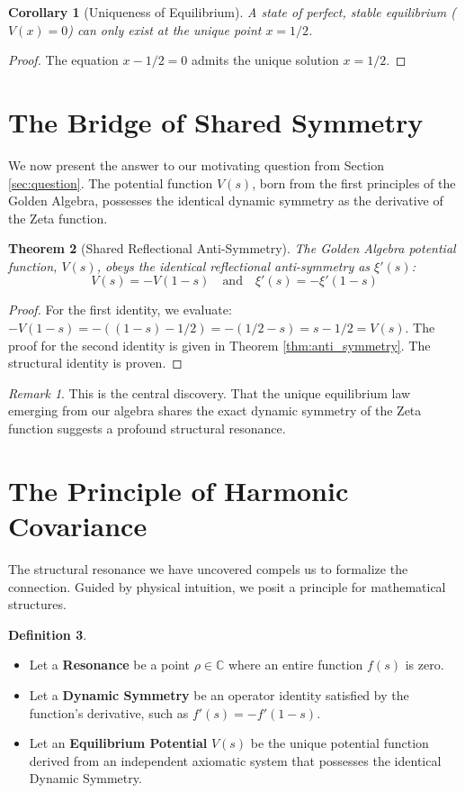 \documentclass{article}
\theoremstyle{plain}
\newtheorem{theorem}{Theorem}[section]
\newtheorem{corollary}[theorem]{Corollary}
\theoremstyle{definition}
\newtheorem{definition}[theorem]{Definition}
\theoremstyle{remark}
\newtheorem*{remark}{Remark}
\begin{document}
\begin{corollary}[Uniqueness of Equilibrium]
A state of perfect, stable equilibrium ($V(x)=0$) can only exist at the unique point $x=1/2$.
\end{corollary}
\begin{proof}
The equation $x - 1/2 = 0$ admits the unique solution $x=1/2$.
\end{proof}

\section{The Bridge of Shared Symmetry}
\label{sec:bridge}
We now present the answer to our motivating question from Section \ref{sec:question}. The potential function $V(s)$, born from the first principles of the Golden Algebra, possesses the identical dynamic symmetry as the derivative of the Zeta function.

\begin{theorem}[Shared Reflectional Anti-Symmetry]
The Golden Algebra potential function, $V(s)$, obeys the identical reflectional anti-symmetry as $\xi'(s)$:
$$ V(s) = -V(1-s) \quad \text{and} \quad \xi'(s) = -\xi'(1-s) $$
\end{theorem}
\begin{proof}
For the first identity, we evaluate: $-V(1-s) = -((1-s) - 1/2) = -(1/2 - s) = s - 1/2 = V(s)$. The proof for the second identity is given in Theorem \ref{thm:anti_symmetry}. The structural identity is proven.
\end{proof}

\begin{remark}
This is the central discovery. That the unique equilibrium law emerging from our algebra shares the exact dynamic symmetry of the Zeta function suggests a profound structural resonance.
\end{remark}

\section{The Principle of Harmonic Covariance}
\label{sec:covariance}
The structural resonance we have uncovered compels us to formalize the connection. Guided by physical intuition, we posit a principle for mathematical structures.

\begin{definition}
\begin{itemize}
    \item Let a \textbf{Resonance} be a point $\rho \in \mathbb{C}$ where an entire function $f(s)$ is zero.
    \item Let a \textbf{Dynamic Symmetry} be an operator identity satisfied by the function's derivative, such as $f'(s) = -f'(1-s)$.
    \item Let an \textbf{Equilibrium Potential} $V(s)$ be the unique potential function derived from an independent axiomatic system that possesses the identical Dynamic Symmetry.
\end{itemize}
\end{definition}
\end{document}
